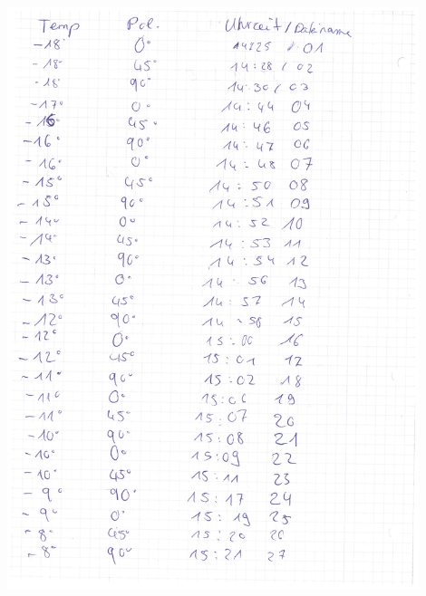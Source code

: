 \documentclass[12pt]{article}
\begin{document}
\begin{minipage}{\textwidth}
	\centering
	\includegraphics[width=0.9\textwidth]{laborbuch/laborbuch2.pdf}
\end{minipage}
\end{document}

